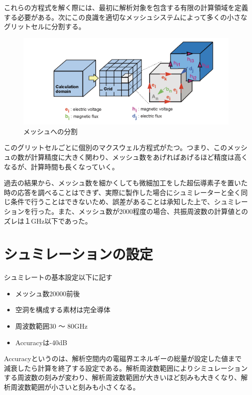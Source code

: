 これらの方程式を解く際には、最初に解析対象を包含する有限の計算領域を定義する必要がある。次にこの良識を適切なメッシュシステムによって多くの小さなグリットセルに分割する。

\vspace{10 mm}

\begin{figure}[h]
  \begin{center}
    \includegraphics[width=12cm]{./image/mesh.png}
    \caption{メッシュへの分割}
    \label{fig:Mesh}
  \end{center}
\end{figure}

このグリットセルごとに個別のマクスウェル方程式がたつ。つまり、このメッシュの数が計算精度に大きく関わり、メッシュ数をあげればあげるほど精度は高くなるが、計算時間も長くなっていく。

過去の結果から、メッシュ数を細かくしても微細加工をした超伝導素子を置いた時の応答を調べることはできず、実際に製作した場合にシュミレーターと全く同じ条件で行うことはできないため、誤差があることは承知した上で、シュミレーションを行った。また、メッシュ数が2000程度の場合、共振周波数の計算値とのズレは１GHz以下であった。

\section{シュミレーションの設定}
シュミレートの基本設定以下に記す

\begin{itemize}
  \item メッシュ数20000前後
  \item 空洞を構成する素材は完全導体
  \item 周波数範囲30 〜 80GHz
  \item Accuracyは-40dB
\end{itemize}

Accuracyというのは、解析空間内の電磁界エネルギーの総量が設定した値まで減衰したら計算を終了する設定である。解析周波数範囲によりシミュレーションする周波数の刻みが変わり、解析周波数範囲が大きいほど刻みも大きくなり、解析周波数範囲が小さいと刻みも小さくなる。
